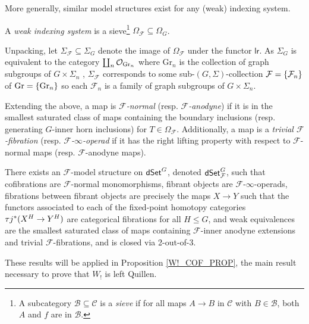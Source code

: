 \documentclass[a4paper,10pt
,draft
]{article}%
\renewcommand{\F}{\mathcal F}
\renewcommand{\1}{\eta}%
\begin{document}
More generally, similar model structures exist for any (weak) indexing system.
\begin{definition}
      A \textit{weak indexing system} is a sieve\footnote{
        A subcategory $\mathcal B \subseteq \mathcal C$ is a \textit{sieve} if for all maps $A \to B$ in $\mathcal C$
        with $B \in \mathcal B$, both $A$ and $f$ are in $\mathcal B$.}
      $\Omega_\F \subseteq \Omega_G$.
\end{definition}

Unpacking, let $\Sigma_\F \subseteq \Sigma_G$ denote the image of $\Omega_\F$ under the functor $\mathsf{lr}$.
As $\Sigma_G$ is equivalent to the category $\coprod_n \mathcal{O}_{\mathrm{Gr}_n}$
where $\mathrm{Gr}_n$ is the collection of graph subgroups of $G \times \Sigma_n$ ,
$\Sigma_\F$ corresponds to some sub-$(G,\Sigma)$-collection $\F = \set{\F_n}$ of $\mathrm{Gr} = \left\{\mathrm{Gr}_n\right\}$
so each $\F_n$ is a family of graph subgroups of $G \times \Sigma_n$.      

Extending the above, a map is \textit{$\F$-normal} (resp. \textit{$\F$-anodyne})
if it is in the smallest saturated class of maps containing the
boundary inclusions (resp. generating $G$-inner horn inclusions) for $T \in \Omega_\F$.
Additionally, a map is a \textit{trivial $\F$-fibration} (resp. \textit{$\F$-$\infty$-operad} if it has the right lifting property with respect to $\F$-normal maps (resp. $\F$-anodyne maps).

\begin{theorem}
      There exists an $\F$-model structure on $\mathsf{dSet}^G$, denoted $\dSet^G_\F$, such that
      cofibrations are $\F$-normal monomorphisms,
      fibrant objects are $\F$-$\infty$-operads,
      fibrations between fibrant objects are precisely the maps $X \to Y$ such that the functors associated to each of the fixed-point homotopy categories $\tau j^{\**}(X^H \to Y^H)$ are categorical fibrations for all $H \leq G$,
      and weak equivalences are the smallest saturated class of maps containing $\F$-inner anodyne extensions and trivial $\F$-fibrations, and is closed via 2-out-of-3.
\end{theorem}

These results will be applied in Proposition \ref{W!_COF_PROP}, the main result necessary to prove that $W_!$ is left Quillen.
\end{document}
